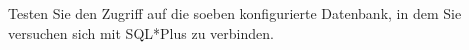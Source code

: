     \item Testen Sie den Zugriff auf die soeben konfigurierte Datenbank, in dem Sie versuchen sich mit SQL*Plus zu verbinden.
